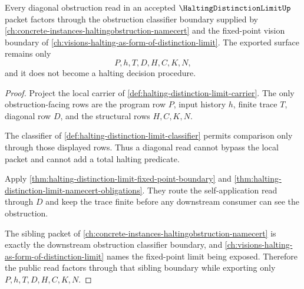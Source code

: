 \begin{theorem}
\label{thm:halting-distinction-limit-sibling-boundary}
Every diagonal obstruction read in an accepted $\HaltingDistinctionLimitUp$ packet factors through the obstruction classifier boundary supplied by \autoref{ch:concrete-instances-haltingobstruction-namecert} and the fixed-point vision boundary of \autoref{ch:visions-halting-as-form-of-distinction-limit}. The exported surface remains only
$$
P,h,T,D,H,C,K,N,
$$
and it does not become a halting decision procedure.
\end{theorem}
\begin{proof}
Project the local carrier of \autoref{def:halting-distinction-limit-carrier}. The only obstruction-facing rows are the program row $P$, input history $h$, finite trace $T$, diagonal row $D$, and the structural rows $H,C,K,N$.

The classifier of \autoref{def:halting-distinction-limit-classifier} permits comparison only through those displayed rows. Thus a diagonal read cannot bypass the local packet and cannot add a total halting predicate.

Apply \autoref{thm:halting-distinction-limit-fixed-point-boundary} and \autoref{thm:halting-distinction-limit-namecert-obligations}. They route the self-application read through $D$ and keep the trace finite before any downstream consumer can see the obstruction.

The sibling packet of \autoref{ch:concrete-instances-haltingobstruction-namecert} is exactly the downstream obstruction classifier boundary, and \autoref{ch:visions-halting-as-form-of-distinction-limit} names the fixed-point limit being exposed. Therefore the public read factors through that sibling boundary while exporting only $P,h,T,D,H,C,K,N$.
\end{proof}

